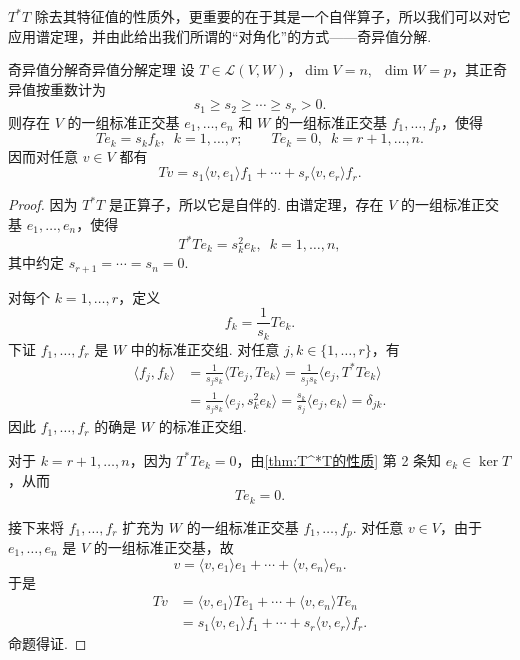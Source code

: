 $ T^*T $ 除去其特征值的性质外，更重要的在于其是一个自伴算子，所以我们可以对它应用谱定理，并由此给出我们所谓的“对角化”的方式——奇异值分解.

\begin{theorem}{奇异值分解}{奇异值分解定理} 
    设 $ T \in \mathcal{L}(V, W) $，$ \dim V = n,\enspace \dim W = p $，其正奇异值按重数计为
    \[
        s_1 \geqslant s_2 \geqslant \cdots \geqslant s_r > 0.
    \]
    则存在 $ V $ 的一组标准正交基 $ e_1, \ldots, e_n $ 和 $ W $ 的一组标准正交基 $ f_1, \ldots, f_p $，使得
    \[
        Te_k = s_k f_k,\enspace k = 1, \ldots, r;\qquad Te_k = 0,\enspace k = r+1, \ldots, n.
    \]
    因而对任意 $ v \in V $ 都有
    \[
        Tv = s_1 \langle v, e_1 \rangle f_1 + \cdots + s_r \langle v, e_r \rangle f_r.
    \]
\end{theorem}

\begin{proof}
    因为 $ T^*T $ 是正算子，所以它是自伴的. 由谱定理，存在 $ V $ 的一组标准正交基 $ e_1, \ldots, e_n $，使得
    \[
        T^*Te_k = s_k^2 e_k,\enspace k = 1, \ldots, n,
    \]
    其中约定 $ s_{r+1} = \cdots = s_n = 0 $.

    对每个 $ k = 1, \ldots, r $，定义
    \[
        f_k = \frac{1}{s_k}Te_k.
    \]
    下证 $ f_1, \ldots, f_r $ 是 $ W $ 中的标准正交组. 对任意 $ j, k \in \{1, \ldots, r\} $，有
    \begin{align*}
        \langle f_j, f_k \rangle
         & = \frac{1}{s_j s_k}\langle Te_j, Te_k \rangle
          = \frac{1}{s_j s_k}\langle e_j, T^*Te_k \rangle \\
         & = \frac{1}{s_j s_k}\langle e_j, s_k^2 e_k \rangle
          = \frac{s_k}{s_j}\langle e_j, e_k \rangle
          = \delta_{jk}.
    \end{align*}
    因此 $ f_1, \ldots, f_r $ 的确是 $ W $ 的标准正交组.

    对于 $ k = r+1, \ldots, n $，因为 $ T^*Te_k = 0 $，由\autoref{thm:T^*T的性质} 第 2 条知 $ e_k \in \ker T $，从而
    \[
        Te_k = 0.
    \]

    接下来将 $ f_1, \ldots, f_r $ 扩充为 $ W $ 的一组标准正交基 $ f_1, \ldots, f_p $. 对任意 $ v \in V $，由于 $ e_1, \ldots, e_n $ 是 $ V $ 的一组标准正交基，故
    \[
        v = \langle v, e_1 \rangle e_1 + \cdots + \langle v, e_n \rangle e_n.
    \]
    于是
    \begin{align*}
        Tv
         & = \langle v, e_1 \rangle Te_1 + \cdots + \langle v, e_n \rangle Te_n \\
         & = s_1 \langle v, e_1 \rangle f_1 + \cdots + s_r \langle v, e_r \rangle f_r.
    \end{align*}
    命题得证.
\end{proof}

